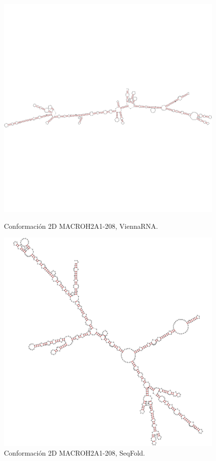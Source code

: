 \documentclass[a4paper,11pt,titlepage]{article}
\theoremstyle{definition}
\begin{document}
\begin{figure}[H]
    \centering
    \begin{minipage}[c]{0.45\textwidth}
        \centering
        \includegraphics[width=\textwidth]{images/MACROH2A1-208-db_vrna.png}
        \caption{Conformación 2D MACROH2A1-208, ViennaRNA.}
        \label{fig:MACROH2A1-208-vrna}
    \end{minipage}
    \hfill
    \begin{minipage}[c]{0.45\textwidth}
        \centering
        \includegraphics[width=\textwidth]{images/MACROH2A1-208-db_sqf.png}
        \caption{Conformación 2D MACROH2A1-208, SeqFold.}
        \label{fig:MACROH2A1-208-sqf}
    \end{minipage}
\end{figure}
\end{document}
